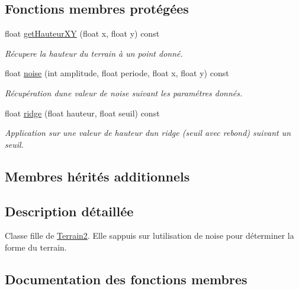 \subsection*{Fonctions membres protégées}
\begin{DoxyCompactItemize}
\item 
float \hyperlink{class_terrain_noise_a4173f17958ed358f9b4a6b005b0ed256}{get\+Hauteur\+X\+Y} (float x, float y) const 
\begin{DoxyCompactList}\small\item\em Récupere la hauteur du terrain à un point donné. \end{DoxyCompactList}\item 
float \hyperlink{class_terrain_noise_aa22eddb4730bc005cebc2d6d62c437d6}{noise} (int amplitude, float periode, float x, float y) const 
\begin{DoxyCompactList}\small\item\em Récupération d\textquotesingle{}une valeur de noise suivant les paramétres donnés. \end{DoxyCompactList}\item 
float \hyperlink{class_terrain_noise_ad3dc579820ae6931c246406f55bbe5b0}{ridge} (float hauteur, float seuil) const 
\begin{DoxyCompactList}\small\item\em Application sur une valeur de hauteur d\textquotesingle{}un ridge (seuil avec rebond) suivant un seuil. \end{DoxyCompactList}\end{DoxyCompactItemize}
\subsection*{Membres hérités additionnels}


\subsection{Description détaillée}
Classe fille de \hyperlink{class_terrain2}{Terrain2}. Elle s\textquotesingle{}appuis sur l\textquotesingle{}utilisation de noise pour déterminer la forme du terrain. 

\subsection{Documentation des fonctions membres}
\hypertarget{class_terrain_noise_a4173f17958ed358f9b4a6b005b0ed256}{}
